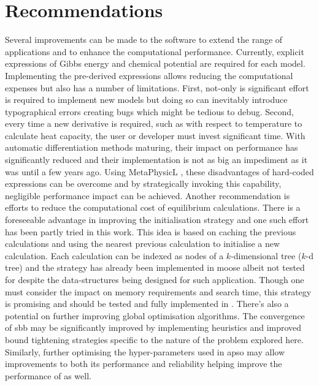 \chapter{Recommendations} \label{chap:future}
	Several improvements can be made to the software to extend the range of applications and to enhance the computational performance. Currently, explicit expressions of Gibbs energy and chemical potential are required for each model. Implementing the pre-derived expressions allows reducing the computational expenses but also has a number of limitations. First, not-only is significant effort is required to implement new models but doing so can inevitably introduce typographical errors creating bugs which might be tedious to debug. Second, every time a new derivative is required, such as with respect to temperature to calculate heat capacity, the user or developer must invest significant time. With automatic differentiation methods maturing, their impact on performance has significantly reduced and their implementation is not as big an impediment as it was until a few years ago. Using MetaPhysicL \cite{Lindsay:2021aa}, these disadvantages of hard-coded expressions can be overcome and by strategically invoking this capability, negligible performance impact can be achieved. Another recommendation is efforts to reduce the computational cost of equilibrium calculations. There is a foreseeable advantage in improving the initialisation strategy and one such effort has been partly tried in this work. This idea is based on caching the previous calculations and using the nearest previous calculation to initialise a new calculation. Each calculation can be indexed as nodes of a $k$-dimensional tree ($k$-d tree) and the strategy has already been implemented in \gls{moose} albeit not tested for {\GEM} despite the data-structures being designed for such application. Though one must consider the impact on memory requirements and search time, this strategy is promising and should be tested and fully implemented in \GEM. There's also a potential on further improving global optimisation algorithms. The convergence of \gls{sbb} may be significantly improved by implementing heuristics and improved bound tightening strategies specific to the nature of the problem explored here. Similarly, further optimising the hyper-parameters used in \gls{apso} may allow improvements to both its performance and reliability helping improve the performance of {\GEM} as well.
	
